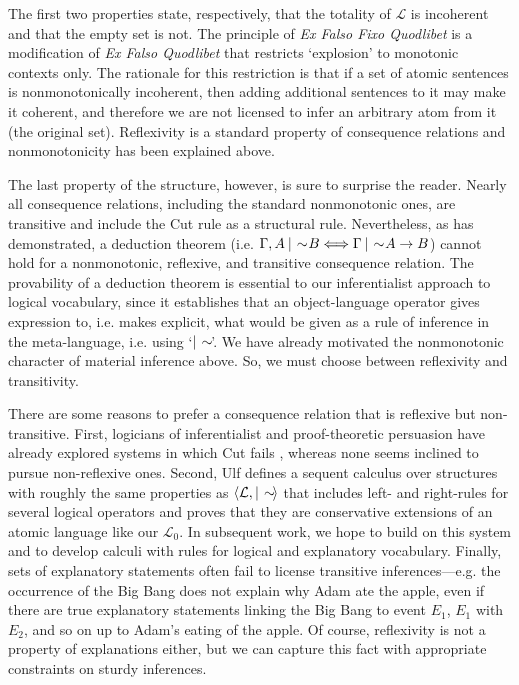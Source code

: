 \documentclass[natbib]{svjour3}                     %
\makeatletter
\newcommand{\nmc}{%
	\mathbin{\mathpalette\nm@\expandafter}
}
\newcommand{\nm@}{\mid\joinrel\mkern-.5mu\sim\mkern-3mu}
\makeatother
\begin{document}
The first two properties state, respectively, that the totality of $ \mathcal{L} $ is incoherent and that the empty set is not. The principle of \textit{Ex Falso Fixo Quodlibet} is a modification of \textit{Ex Falso Quodlibet} that restricts `explosion' to monotonic contexts only. The rationale for this restriction is that if a set of atomic sentences is nonmonotonically incoherent, then adding additional sentences to it may make it coherent, and therefore we are not licensed to infer an arbitrary atom from it (the original set). Reflexivity is a standard property of consequence relations and nonmonotonicity has been explained above. 

The last property of the structure, however, is sure to surprise the reader. Nearly all consequence relations, including the standard nonmonotonic ones, are transitive and include the Cut rule as a structural rule. Nevertheless, as \cite{Morgan2000} has demonstrated,  a deduction theorem (i.e. $\Gamma, A \nmc B \Longleftrightarrow \Gamma \nmc A \rightarrow B $) cannot hold for a nonmonotonic, reflexive, and transitive consequence relation.  The provability of a deduction theorem is essential to our inferentialist approach to logical vocabulary, since it establishes that an object-language operator gives expression to, i.e. makes explicit, what would be given as a rule of inference in the meta-language, i.e. using `$ \nmc $'. We have already motivated the nonmonotonic character of material inference above. So, we must choose between  reflexivity and transitivity. 

There are some reasons to prefer a consequence relation that is reflexive but non-transitive.  First, logicians of inferentialist and proof-theoretic persuasion have already explored systems in which Cut fails \citep{Ripley2011,Tennant2014}, whereas none seems inclined to pursue non-reflexive ones. Second, Ulf \cite{Hlobil2016}  defines a sequent calculus over structures with roughly the same properties as  $ \langle \mathcal{L}, \nmc \rangle $ that includes left- and right-rules for several logical operators and proves that they are conservative extensions of an atomic language like our $ \mathcal{L}_0 $. In subsequent work, we hope to build on this system and to develop calculi with rules for logical and explanatory vocabulary. Finally, sets of explanatory statements often fail to license transitive inferences---e.g. the occurrence of the Big Bang does not explain why Adam ate the apple, even if there are true explanatory statements linking the Big Bang to event $E_1$, $ E_1 $ with $ E_2 $, and so on up to Adam's eating of the apple. Of course, reflexivity is not a property of explanations either, but we can capture this fact with appropriate constraints on sturdy inferences.
\end{document}
